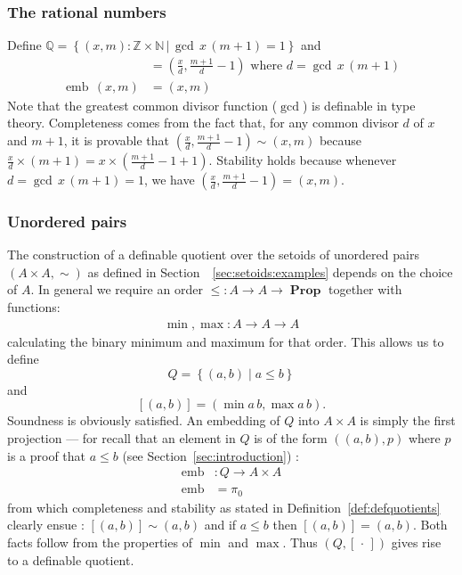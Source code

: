 \documentclass[envcountsame]{llncs}
\newcommand{\N}{\mathbb{N}}
\newcommand{\Q}{\mathbb{Q}}
\newcommand{\Z}{\mathbb{Z}}
\newcommand{\dotph}{\,\cdot\,} %
\providecommand{\class}[1]{[#1]}
\providecommand{\set}  [1]{\left\{#1\right\}}
\DeclareMathOperator{\Prop}{\mathbf{Prop}}
\DeclareMathOperator{\emb}{emb}
\begin{document}
\subsubsection*{The rational numbers}

Define $\Q = \set{(x,m):\Z\times\N \,|\, \gcd\, x\,  (m+1) = 1}$ and
\begin{align*}
\class{(x,m)}&=\left(\frac{x}{d},\frac{m+1}{d}-1\right) \text{ where } d = \gcd\,x \,(m+1)\\
\emb \,(x,m) &= (x,m)
\end{align*}
Note that the greatest common divisor function ($\gcd$) is definable in type theory. Completeness comes from the fact that, for any common divisor $d$ of $x$ and $m+1$, it is provable that $\left(\frac x d,\frac {m+1} d-1\right)\sim\left(x,m\right)$ because $\frac x d \times (m+1) = x\times(\frac {m+1} d - 1+1)$.  Stability holds because whenever $d=\gcd\, x\, (m+1) = 1$, we have $\left(\frac{x}{d},\frac{m+1}{d}-1\right)=(x,m)$.


\subsubsection*{Unordered pairs}

The construction of a definable quotient over the setoids of unordered pairs $(A\times A,\sim)$ as defined in Section~~\ref{sec:setoids:examples} depends on the choice of $A$. In general we
require an order $\leq : A \to A \to \Prop$ together with functions:
\begin{align*}
\min, \max : A \to A \to A
\end{align*}
calculating the binary minimum and maximum for that order. This allows us to  define
\[
Q = \set{(a , b) \mid  a \leq b}
\]
and
\[ [(a,b)] = (\min a\, b, \max a \,b).\]
Soundness is obviously satisfied. An embedding of $Q$ into  $A\times A$ is simply the first projection --- for recall that an element in $Q$ is of the form $((a,b),p)$ where $p$ is a proof that $a\leq b$ (see Section~\ref{sec:introduction}) :
\begin{align*}
\emb &: Q \to A\times A\\
\emb &= \pi_0
\end{align*}
from which completeness and stability as stated in Definition~\ref{def:defquotients} clearly ensue : $[(a,b)] \sim (a,b)$ and if $a\leq b$ then $[(a,b)]=(a,b)$. Both facts follow from
 the properties of $\min$ and $\max$. 
Thus $(Q,\class\dotph)$ gives rise to a definable quotient.
\end{document}
